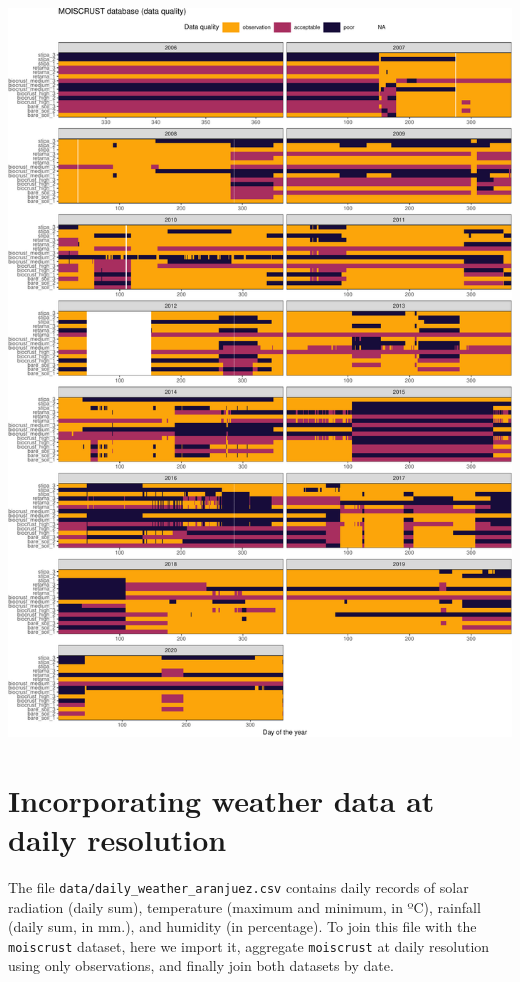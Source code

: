 \documentclass[
  table]{article}
\begin{document}
\includegraphics{moiscrust_files/figure-latex/unnamed-chunk-29-1.pdf}

\hypertarget{incorporating-weather-data-at-daily-resolution}{%
\section{Incorporating weather data at daily
resolution}\label{incorporating-weather-data-at-daily-resolution}}

The file \texttt{data/daily\_weather\_aranjuez.csv} contains daily
records of solar radiation (daily sum), temperature (maximum and
minimum, in ºC), rainfall (daily sum, in mm.), and humidity (in
percentage). To join this file with the \texttt{moiscrust} dataset, here
we import it, aggregate \texttt{moiscrust} at daily resolution using
only observations, and finally join both datasets by date.
\end{document}
